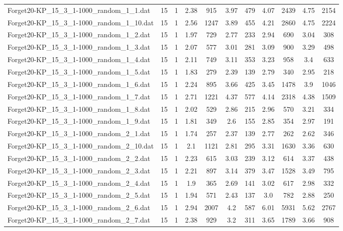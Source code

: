 \begin{table}[!ht]
\begin{tabular}{lcccccccccc}
Forget20-KP\_15\_3\_1-1000\_random\_1\_1.dat & 15 & 1 & 2.38 & 915 & 3.97 & 479 & 4.07 & 2439 & 4.75 & 2154 \\
Forget20-KP\_15\_3\_1-1000\_random\_1\_10.dat & 15 & 1 & 2.56 & 1247 & 3.89 & 455 & 4.21 & 2860 & 4.75 & 2224 \\
Forget20-KP\_15\_3\_1-1000\_random\_1\_2.dat & 15 & 1 & 1.97 & 729 & 2.77 & 233 & 2.94 & 690 & 3.04 & 308 \\
Forget20-KP\_15\_3\_1-1000\_random\_1\_3.dat & 15 & 1 & 2.07 & 577 & 3.01 & 281 & 3.09 & 900 & 3.29 & 498 \\
Forget20-KP\_15\_3\_1-1000\_random\_1\_4.dat & 15 & 1 & 2.11 & 749 & 3.11 & 353 & 3.23 & 958 & 3.4 & 633 \\
Forget20-KP\_15\_3\_1-1000\_random\_1\_5.dat & 15 & 1 & 1.83 & 279 & 2.39 & 139 & 2.79 & 340 & 2.95 & 218 \\
Forget20-KP\_15\_3\_1-1000\_random\_1\_6.dat & 15 & 1 & 2.24 & 895 & 3.66 & 425 & 3.45 & 1478 & 3.9 & 1046 \\
Forget20-KP\_15\_3\_1-1000\_random\_1\_7.dat & 15 & 1 & 2.71 & 1221 & 4.37 & 577 & 4.14 & 2318 & 4.38 & 1509 \\
Forget20-KP\_15\_3\_1-1000\_random\_1\_8.dat & 15 & 1 & 2.02 & 529 & 2.86 & 215 & 2.96 & 570 & 3.21 & 334 \\
Forget20-KP\_15\_3\_1-1000\_random\_1\_9.dat & 15 & 1 & 1.81 & 349 & 2.6 & 155 & 2.85 & 354 & 2.97 & 191 \\
Forget20-KP\_15\_3\_1-1000\_random\_2\_1.dat & 15 & 1 & 1.74 & 257 & 2.37 & 139 & 2.77 & 262 & 2.62 & 346 \\
Forget20-KP\_15\_3\_1-1000\_random\_2\_10.dat & 15 & 1 & 2.1 & 1121 & 2.81 & 295 & 3.31 & 1630 & 3.36 & 630 \\
Forget20-KP\_15\_3\_1-1000\_random\_2\_2.dat & 15 & 1 & 2.23 & 615 & 3.03 & 239 & 3.12 & 614 & 3.37 & 438 \\
Forget20-KP\_15\_3\_1-1000\_random\_2\_3.dat & 15 & 1 & 2.21 & 897 & 3.14 & 379 & 3.47 & 1528 & 3.49 & 795 \\
Forget20-KP\_15\_3\_1-1000\_random\_2\_4.dat & 15 & 1 & 1.9 & 365 & 2.69 & 141 & 3.02 & 617 & 2.98 & 332 \\
Forget20-KP\_15\_3\_1-1000\_random\_2\_5.dat & 15 & 1 & 1.94 & 571 & 2.43 & 137 & 3.0 & 782 & 2.88 & 250 \\
Forget20-KP\_15\_3\_1-1000\_random\_2\_6.dat & 15 & 1 & 2.94 & 2007 & 4.2 & 587 & 6.01 & 5931 & 5.62 & 2767 \\
Forget20-KP\_15\_3\_1-1000\_random\_2\_7.dat & 15 & 1 & 2.38 & 929 & 3.2 & 311 & 3.65 & 1789 & 3.66 & 908 \\

\end{tabular}
\end{table}

